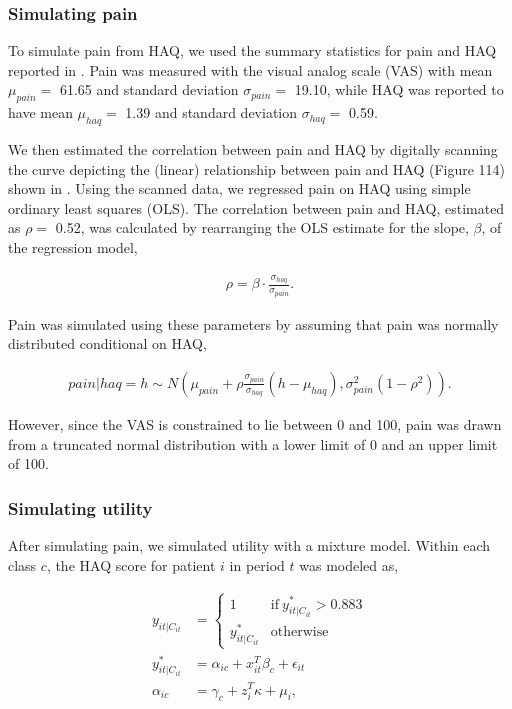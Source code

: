\documentclass[11pt,final,fleqn]{article}\usepackage[]{graphicx}\usepackage[]{color}
\theoremstyle{plain}
\begin{document}
\begin{appendices}
\subsubsection{Simulating pain}
To simulate pain from HAQ, we used the summary statistics for pain and HAQ reported in \citet{sarzi2002correlation}. Pain was measured with the visual analog scale (VAS) with mean  $\mu_{pain} =$ 61.65 and standard deviation $\sigma_{pain} =$ 19.10, while HAQ was reported to have mean $\mu_{haq} =$ 1.39 and standard deviation $\sigma_{haq} =$ 0.59. 

We then estimated the correlation between pain and HAQ by digitally scanning the curve depicting the (linear) relationship between pain and HAQ (Figure 114) shown in \citet{stevenson2016adalimumab}. Using the scanned data, we regressed pain on HAQ using simple ordinary least squares (OLS). The correlation between pain and HAQ, estimated as $\rho =$ 0.52, was calculated by rearranging the OLS estimate for the slope, $\beta$, of the regression model,

\begin{align}
\rho = \beta \cdot \frac{\sigma_{haq}}{\sigma_{pain}}.
\end{align}

Pain was simulated using these parameters by assuming that pain was normally distributed conditional on HAQ,

\begin{align}
pain | haq = h \sim N\left (\mu_{pain} + \rho \frac{\sigma_{pain}}{\sigma_{haq}}(h - \mu_{haq}), \sigma^2_{pain}(1 - \rho^2)\right).
\end{align}

However, since the VAS is constrained to lie between 0 and 100, pain was drawn from a truncated normal distribution with a lower limit of 0 and an upper limit of 100. 

\subsubsection{Simulating utility}
After simulating pain, we simulated utility with a mixture model. Within each class $c$, the HAQ score for patient $i$ in period $t$ was modeled as,

\begin{align}
y_{it|C_{it}} &= 
\begin{cases}
  1 & \text{if}\  y^{*}_{it|C_{it}}>0.883 \\
  y^{*}_{it|C_{it}} & \text{otherwise}
\end{cases}\\
y^{*}_{it|C_{it}} &= \alpha_{ic} +  x_{it}^T\beta_{c} + \epsilon_{it}\\
\alpha_{ic} &=  \gamma_{c} + z_{i}^T\kappa + \mu_{i},
\end{align}


\end{appendices}
\end{document}
